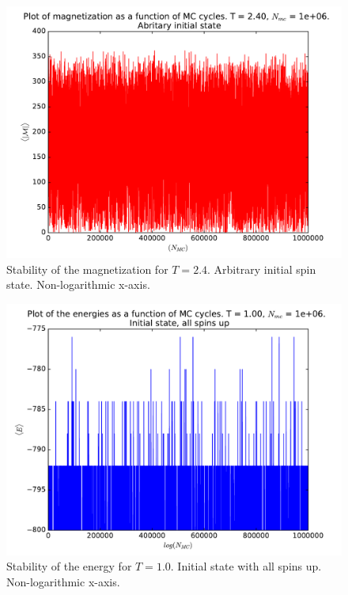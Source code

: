 \documentclass[12pt]{article}
\begin{document}
\begin{figure}[H]
\centering
\includegraphics[width=\linewidth]{Plots/Magnetization_stability_T24.pdf}
\caption{Stability of the magnetization for $T=2.4$. Arbitrary initial spin state. Non-logarithmic x-axis.}
\end{figure}

\begin{figure}[H]
\centering
\includegraphics[width=\linewidth]{Plots/Energy_stability_UpInitSpin_T1.pdf}
\caption{Stability of the energy for $T = 1.0$. Initial state with all spins up. Non-logarithmic x-axis.}
\end{figure}
\end{document}
